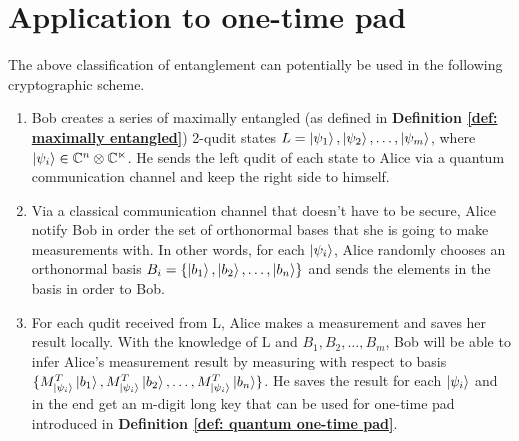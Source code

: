 \section{Application to one-time pad}
The above classification of entanglement can potentially be used in the following cryptographic scheme.
\begin{enumerate}
    \item Bob creates a series of maximally entangled (as defined in \textbf{Definition \ref{def: maximally entangled}}) 2-qudit states $L={\ket{\psi_1}, \ket{\psi_2}, \hdots, \ket{\psi_m}}$, where $\ket{\psi_i} \in \mathbb{C}^n \otimes \mathbb{C^n}$. He sends the left qudit of each state to Alice via a quantum communication channel and keep the right side to himself.
    \item Via a classical communication channel that doesn't have to be secure, Alice notify Bob in order the set of orthonormal bases that she is going to make measurements with. In other words, for each $\ket{\psi_i}$, Alice randomly chooses an orthonormal basis $B_i=\{\ket{b_1}, \ket{b_2}, \hdots, \ket{b_n}\}$ and sends the elements in the basis in order to Bob.
    \item For each qudit received from L, Alice makes a measurement and saves her result locally. With the knowledge of L and $B_1, B_2, \hdots, B_m$, Bob will be able to infer Alice's measurement result by measuring with respect to basis $\{M_{\ket{\psi_i}}^T \ket{b_1}, M_{\ket{\psi_i}}^T \ket{b_2}, \hdots, M_{\ket{\psi_i}}^T \ket{b_n}\}$. He saves the result for each $\ket{\psi_i}$ and in the end get an m-digit long key that can be used for one-time pad introduced in \textbf{Definition \ref{def: quantum one-time pad}}.
\end{enumerate}